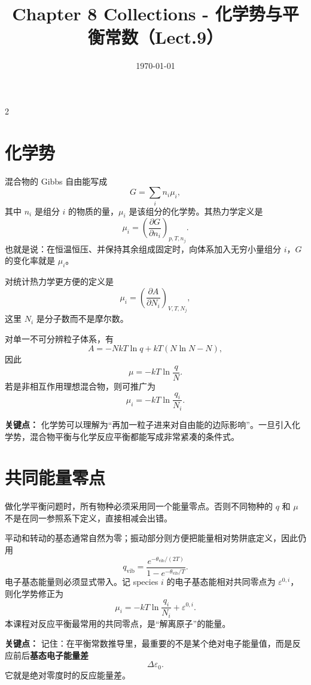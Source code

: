 \documentclass[a4paper,9pt]{article}
\title{\vspace{-2em}\Large\bfseries\color{sectioncolor} Chapter 8 Collections - 化学势与平衡常数（Lect.9）\vspace{-1em}}
\author{}
\date{\today}
\newenvironment{keypoint}
{\par\vspace{0.3em}\noindent\begin{tcolorbox}[colback=keybg,colframe=keycolor,boxrule=0.5pt,arc=2pt,left=2pt,right=2pt,top=2pt,bottom=2pt,boxsep=0pt]\noindent\textcolor{keycolor}{\textbf{关键点：}}}
{\end{tcolorbox}\par\vspace{0.3em}}
\begin{document}
\maketitle
\thispagestyle{fancy}
\begin{multicols}{2}
	\scriptsize{\tableofcontents}

	\section{化学势}

	混合物的 Gibbs 自由能写成
	\[
		G=\sum_i n_i\mu_i,
	\]
	其中 $n_i$ 是组分 $i$ 的物质的量，$\mu_i$ 是该组分的化学势。其热力学定义是
	\[
		\mu_i=\left(\frac{\partial G}{\partial n_i}\right)_{p,T,n_j}.
	\]
	也就是说：在恒温恒压、并保持其余组成固定时，向体系加入无穷小量组分 $i$，$G$ 的变化率就是 $\mu_i$。

	对统计热力学更方便的定义是
	\[
		\mu_i=\left(\frac{\partial A}{\partial N_i}\right)_{V,T,N_j},
	\]
	这里 $N_i$ 是分子数而不是摩尔数。

	对单一不可分辨粒子体系，有
	\[
		A=-NkT\ln q+kT(N\ln N-N),
	\]
	因此
	\[
		\mu=-kT\ln\frac{q}{N}.
	\]
	若是非相互作用理想混合物，则可推广为
	\[
		\mu_i=-kT\ln\frac{q_i}{N_i}.
	\]

	\begin{keypoint}
		化学势可以理解为“再加一粒子进来对自由能的边际影响”。一旦引入化学势，混合物平衡与化学反应平衡都能写成非常紧凑的条件式。
	\end{keypoint}

	\section{共同能量零点}

	做化学平衡问题时，所有物种必须采用同一个能量零点。否则不同物种的 $q$ 和 $\mu$ 不是在同一参照系下定义，直接相减会出错。

	平动和转动的基态通常自然为零；振动部分则方便把能量相对势阱底定义，因此仍用
	\[
		q_{\mathrm{vib}}=\frac{e^{-\theta_{\mathrm{vib}}/(2T)}}{1-e^{-\theta_{\mathrm{vib}}/T}}.
	\]
	电子基态能量则必须显式带入。记 species $i$ 的电子基态能相对共同零点为 $\varepsilon^{0,i}$，则化学势修正为
	\[
		\mu_i=-kT\ln\frac{q_i}{N_i}+\varepsilon^{0,i}.
	\]
	本课程对反应平衡最常用的共同零点，是“解离原子”的能量。

	\begin{keypoint}
		记住：在平衡常数推导里，最重要的不是某个绝对电子能量值，而是反应前后\textbf{基态电子能量差}
		\[
			\Delta\varepsilon_0.
		\]
		它就是绝对零度时的反应能量差。
	\end{keypoint}


\end{multicols}
\end{document}

